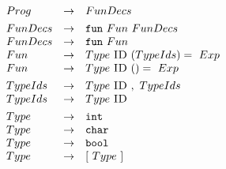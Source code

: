 \documentclass[a4paper,11pt]{article}
\begin{document}
\newcommand{\keyw}[1]{\mbox{\texttt{#1}}}
\newcommand{\tok}[1]{\mbox{\sc #1}}
\begin{figure}[t!]
\renewcommand{\arraystretch}{0.87}
\begin{minipage}{0.5\textwidth}
\[
\begin{array}{lcl}
Prog & \rightarrow & FunDecs \\[0.9ex]

FunDecs & \rightarrow & \keyw{fun} \ Fun \ FunDecs \\
FunDecs & \rightarrow & \keyw{fun} \ Fun \\
Fun & \rightarrow & Type \ \tok{ID} \ ( TypeIds ) = \ Exp  \\
Fun & \rightarrow & Type \ \tok{ID} \ ( ) = \ Exp  \\[0.9ex]

TypeIds & \rightarrow & Type \ \tok{ID}\ ,\ TypeIds\\
TypeIds & \rightarrow & Type \ \tok{ID}\\[0.9ex]

Type & \rightarrow & \keyw{int} \\
Type & \rightarrow & \keyw{char} \\
Type & \rightarrow & \keyw{bool} \\
Type & \rightarrow & [ \ Type \ ] \\ [0.9ex]


\end{array}\]
\end{minipage}
\end{figure}
\end{document}
